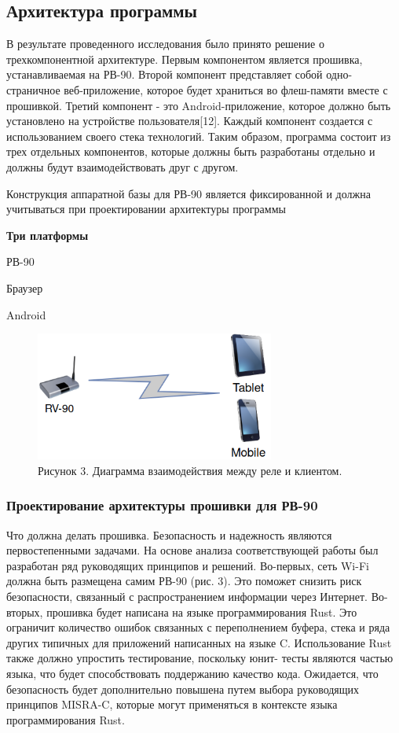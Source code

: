 \subsection{ Архитектура программы }
В результате проведенного исследования было принято решение о трехкомпонентной архитектуре. Первым компонентом является прошивка, устанавливаемая на РВ-90. Второй компонент представляет собой одно-страничное веб-приложение, которое будет храниться во флеш-памяти вместе с прошивкой.  Третий компонент - это Android-приложение, которое должно быть установлено на устройстве пользователя[12]. Каждый компонент создается с использованием своего стека технологий. Таким образом, программа состоит из трех отдельных компонентов, которые должны быть разработаны отдельно и должны будут взаимодействовать друг с другом. 

Конструкция аппаратной базы для РВ-90 является фиксированной и должна учитываться при проектировании архитектуры программы

\textbf{Три платформы}
\begin{my_itemize}
\item РВ-90
\item Браузер
\item Android
\end{my_itemize}


\begin{figure}[h!]
    \centering
    \includegraphics[width=0.7\textwidth]{three_platforms.png}
    \caption{Рисунок 3. Диаграмма взаимодействия между реле и клиентом.}
\end{figure}



\subsubsection{ Проектирование архитектуры прошивки для РВ-90 }
Что должна делать прошивка.
Безопасность и надежность являются первостепенными задачами. На основе анализа соответствующей работы был разработан ряд руководящих принципов и решений. Во-первых, сеть Wi-Fi должна быть размещена самим РВ-90 (рис. 3). Это поможет снизить риск безопасности, связанный с распространением информации через Интернет. Во-вторых, прошивка будет написана на языке программирования Rust. Это ограничит количество ошибок связанных с переполнением буфера, стека и ряда других типичных для приложений написанных на языке C. Использование Rust также должно упростить тестирование, поскольку юнит- тесты являются частью языка, что будет способствовать поддержанию качество кода. Ожидается, что безопасность будет дополнительно повышена путем выбора руководящих принципов MISRA-C, которые могут применяться в контексте языка программирования Rust. 

